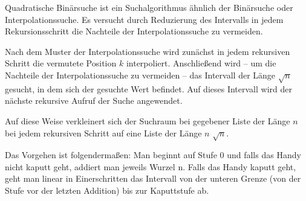 \documentclass{bschlangaul-aufgabe}
\begin{document}
\begin{enumerate}
\begin{bExkurs}
Quadratische Binärsuche ist ein Suchalgorithmus ähnlich der Binärsuche
oder Interpolationssuche. Es versucht durch Reduzierung des Intervalls
in jedem Rekursionsschritt die Nachteile der Interpolationssuche zu
vermeiden.

Nach dem Muster der Interpolationssuche wird zunächst in jedem
rekursiven Schritt die vermutete Position $k$ interpoliert. Anschließend
wird – um die Nachteile der Interpolationssuche zu vermeiden – das
Intervall der Länge $\sqrt{n}$ gesucht, in
dem sich der gesuchte Wert befindet. Auf dieses Intervall wird der
nächste rekursive Aufruf der Suche angewendet.

Auf diese Weise verkleinert sich der Suchraum bei gegebener Liste der
Länge $n$ bei jedem rekursiven Schritt auf eine Liste der Länge $n$
$\sqrt n$.
\end{bExkurs}

\begin{bAntwort}
Das Vorgehen ist folgendermaßen: Man beginnt auf Stufe 0 und falls das
Handy nicht kaputt geht, addiert man jeweils Wurzel n. Falls das Handy
kaputt geht, geht man linear in Einerschritten das Intervall von der
unteren Grenze (\dh von der Stufe vor der letzten Addition) bis zur
Kaputtstufe ab.

\end{bAntwort}

\end{enumerate}
\end{document}
